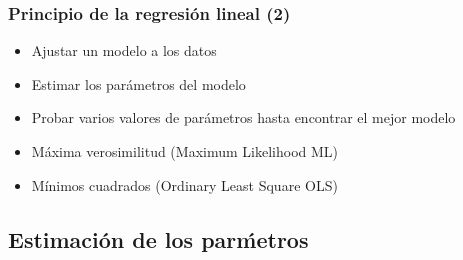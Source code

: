 \documentclass[mathserif]{beamer}
\begin{document}
\begin{frame}[label=obsgen]
   \frametitle{Principio de la regresi\'on lineal (2)}
    \begin{itemize}[<+-| handout:1>]
      \item Ajustar un modelo a los datos 
      \item Estimar los par\'ametros del modelo
      \item Probar varios valores de par\'ametros hasta encontrar el mejor modelo
      \item M\'axima verosimilitud (Maximum Likelihood ML)
      \item M\'inimos cuadrados (Ordinary Least Square OLS) 
   \end{itemize}
\end{frame}%


\subsection[Estimaci\'on]{Estimaci\'on de los par\'metros}
\end{document}
